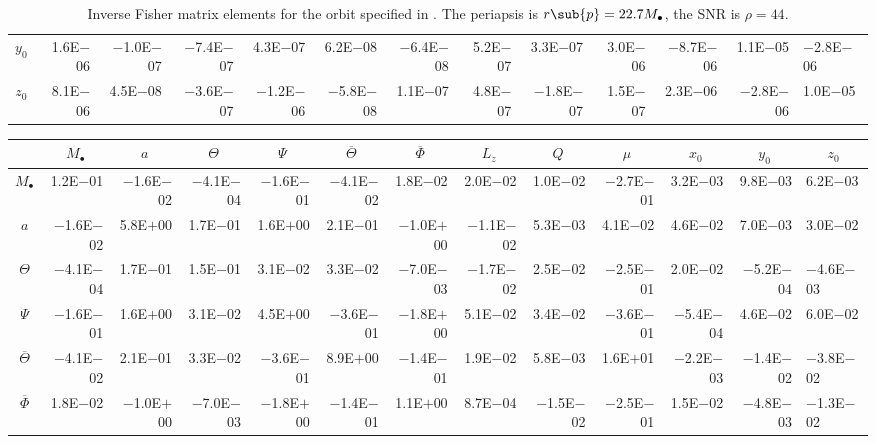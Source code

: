\begin{sidewaystable}[htbp]
\begin{tabular}{crrrrrrrrrrr}
$y_0$ & 1.6E$-$06 & $-$1.0E$-$07 & $-$7.4E$-$07 & 4.3E$-$07 & 6.2E$-$08 & $-$6.4E$-$08 & 5.2E$-$07 & 3.3E$-$07 & 3.0E$-$06 & $-$8.7E$-$06 & 1.1E$-$05 & $-$2.8E$-$06 \\
$z_0$ & 8.1E$-$06 & 4.5E$-$08 & $-$3.6E$-$07 & $-$1.2E$-$06 & $-$5.8E$-$08 & 1.1E$-$07 & 4.8E$-$07 & $-$1.8E$-$07 & 1.5E$-$07 & 2.3E$-$06 & $-$2.8E$-$06 & 1.0E$-$05 \\
\bottomrule
\end{tabular}
\caption{Inverse Fisher matrix elements for the orbit specified in . The periapsis is $r\sub{p} = 22.7 M_\bullet$, the SNR is $\rho = 44$.}
\label{tab:Fisher_6}
\end{sidewaystable}
\begin{sidewaystable}[htbp]\squeezetable
\centering
\begin{tabular}{crrrrrrrrrrr}
\toprule
 &  &  &  &  &  &  &  &  &  &  &  &  \\ \midrule 
$M_\bullet$ & 1.2E$-$01 & $-$1.6E$-$02 & $-$4.1E$-$04 & $-$1.6E$-$01 & $-$4.1E$-$02 & 1.8E$-$02 & 2.0E$-$02 & 1.0E$-$02 & $-$2.7E$-$01 & 3.2E$-$03 & 9.8E$-$03 & 6.2E$-$03 \\
$a$ & $-$1.6E$-$02 & 5.8E$+$00 & 1.7E$-$01 & 1.6E$+$00 & 2.1E$-$01 & $-$1.0E$+$00 & $-$1.1E$-$02 & 5.3E$-$03 & 4.1E$-$02 & 4.6E$-$02 & 7.0E$-$03 & 3.0E$-$02 \\
$\Theta$ & $-$4.1E$-$04 & 1.7E$-$01 & 1.5E$-$01 & 3.1E$-$02 & 3.3E$-$02 & $-$7.0E$-$03 & $-$1.7E$-$02 & 2.5E$-$02 & $-$2.5E$-$01 & 2.0E$-$02 & $-$5.2E$-$04 & $-$4.6E$-$03 \\
$\Psi$ & $-$1.6E$-$01 & 1.6E$+$00 & 3.1E$-$02 & 4.5E$+$00 & $-$3.6E$-$01 & $-$1.8E$+$00 & 5.1E$-$02 & 3.4E$-$02 & $-$3.6E$-$01 & $-$5.4E$-$04 & 4.6E$-$02 & 6.0E$-$02 \\
$\overline{\Theta}$ & $-$4.1E$-$02 & 2.1E$-$01 & 3.3E$-$02 & $-$3.6E$-$01 & 8.9E$+$00 & $-$1.4E$-$01 & 1.9E$-$02 & 5.8E$-$03 & 1.6E$+$01 & $-$2.2E$-$03 & $-$1.4E$-$02 & $-$3.8E$-$02 \\
$\overline{\Phi}$ & 1.8E$-$02 & $-$1.0E$+$00 & $-$7.0E$-$03 & $-$1.8E$+$00 & $-$1.4E$-$01 & 1.1E$+$00 & 8.7E$-$04 & $-$1.5E$-$02 & $-$2.5E$-$01 & 1.5E$-$02 & $-$4.8E$-$03 & $-$1.3E$-$02 \\

\end{tabular}
\end{sidewaystable}
